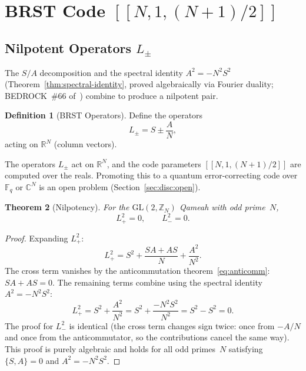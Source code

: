 \documentclass[aip,jmp,reprint,superscriptaddress,floatfix,nofootinbib]{revtex4-2}
\newtheorem{theorem}{Theorem}
\theoremstyle{definition}
\newtheorem{definition}[theorem]{Definition}
\theoremstyle{remark}
\newcommand{\ZN}{\mathbb{Z}_N}
\newcommand{\GL}{\mathrm{GL}}
\begin{document}
\section{BRST Code \texorpdfstring{$[[N, 1, (N{+}1)/2]]$}{[[N, 1, (N+1)/2]]}}
\label{sec:brst}

\subsection{Nilpotent Operators \texorpdfstring{$L_\pm$}{L+-}}
\label{sec:brst:nilpotent}

The $S/A$ decomposition and the spectral identity
$A^2 = -N^2 S^2$ (Theorem~\ref{thm:spectral-identity}, proved algebraically via
Fourier duality; BEDROCK~\#66 of~\cite{QHOTSv67}) combine to produce a
nilpotent pair.

\begin{definition}[BRST Operators]\label{def:Lpm}
Define the operators
\begin{equation}\label{eq:Lpm}
L_\pm = S \pm \frac{A}{N},
\end{equation}
acting on $\mathbb{R}^N$ (column vectors).
\end{definition}

\noindent
The operators $L_\pm$ act on $\mathbb{R}^N$, and the code parameters
$[[N,1,(N{+}1)/2]]$ are computed over the reals.  Promoting this to a
quantum error-correcting code over $\mathbb{F}_q$ or $\mathbb{C}^N$ is
an open problem (Section~\ref{sec:disc:open}).

\begin{theorem}[Nilpotency]\label{thm:nilpotent}
For the $\GL(2,\ZN)$ Qameah with odd prime~$N$,
\begin{equation}\label{eq:nilpotent}
L_+^2 = 0, \qquad L_-^2 = 0.
\end{equation}
\end{theorem}

\begin{proof}
Expanding $L_+^2$:
\begin{equation}
L_+^2 = S^2 + \frac{SA + AS}{N} + \frac{A^2}{N^2}.
\end{equation}
The cross term vanishes by the anticommutation
theorem~\eqref{eq:anticomm}: $SA + AS = 0$.  The remaining terms
combine using the spectral identity $A^2 = -N^2 S^2$:
\begin{equation}
L_+^2 = S^2 + \frac{A^2}{N^2} = S^2 + \frac{-N^2 S^2}{N^2}
  = S^2 - S^2 = 0.
\end{equation}
The proof for $L_-^2$ is identical (the cross term changes sign
twice: once from $-A/N$ and once from the anticommutator, so the
contributions cancel the same way).  This proof is purely algebraic
and holds for all odd primes~$N$ satisfying $\{S,A\} = 0$ and
$A^2 = -N^2 S^2$.
\end{proof}
\end{document}

